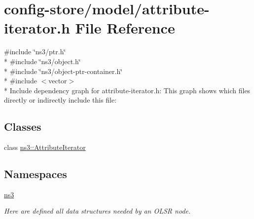 \hypertarget{attribute-iterator_8h}{}\section{config-\/store/model/attribute-\/iterator.h File Reference}
\label{attribute-iterator_8h}
{\ttfamily \#include \char`\"{}ns3/ptr.\+h\char`\"{}}\\*
{\ttfamily \#include \char`\"{}ns3/object.\+h\char`\"{}}\\*
{\ttfamily \#include \char`\"{}ns3/object-\/ptr-\/container.\+h\char`\"{}}\\*
{\ttfamily \#include $<$vector$>$}\\*
Include dependency graph for attribute-\/iterator.h\+:
This graph shows which files directly or indirectly include this file\+:
\subsection*{Classes}
\begin{DoxyCompactItemize}
\item 
class \hyperlink{classns3_1_1AttributeIterator}{ns3\+::\+Attribute\+Iterator}
\end{DoxyCompactItemize}
\subsection*{Namespaces}
\begin{DoxyCompactItemize}
\item 
 \hyperlink{namespacens3}{ns3}
\begin{DoxyCompactList}\small\item\em Here are defined all data structures needed by an O\+L\+SR node. \end{DoxyCompactList}\end{DoxyCompactItemize}
